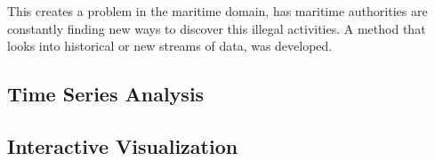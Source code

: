 This creates a problem in the maritime domain, has maritime authorities are constantly finding new ways to discover this illegal activities. A method that looks into historical or new streams of data, was developed. 


\subsection{Time Series Analysis}

\subsection{Interactive Visualization}




